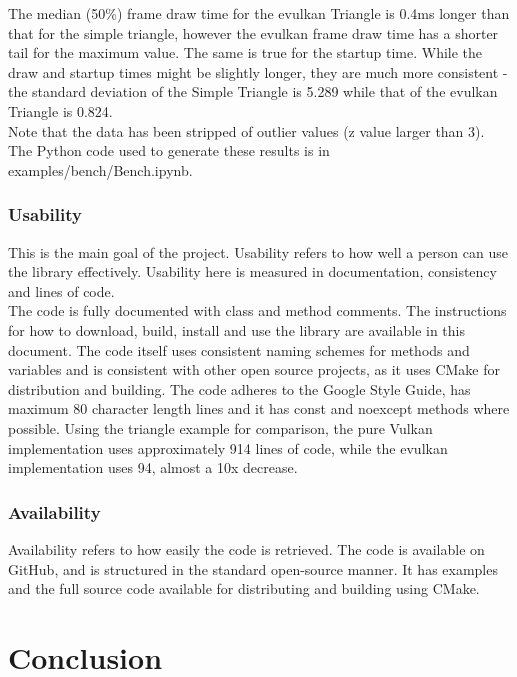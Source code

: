 \documentclass[12pt]{report}
\theoremstyle{definition}
\begin{document}
        The median (50\%) frame draw time for the evulkan Triangle is 0.4ms
        longer than that for the simple triangle, however the evulkan frame
        draw time has a shorter tail for the maximum value.  The same is true
        for the startup time. While the draw and startup times might be
        slightly longer, they are much more consistent - the standard
        deviation of the Simple Triangle is 5.289 while that of the evulkan
        Triangle is 0.824. \\

        Note that the data has been stripped of outlier values (z value larger than 3).
        The Python code used to generate these results is in examples/bench/Bench.ipynb.

    \subsection{Usability}

      This is the main goal of the project. Usability refers to how well a person
      can use the library effectively. Usability here is measured in
      documentation, consistency and lines of code. \\

      The code is fully documented with class and method comments. The
      instructions for how to download, build, install and use the library
      are available in this document. The code itself uses consistent naming
      schemes for methods and variables and is consistent with other open source
      projects, as it uses CMake for distribution and building. The code
      adheres to the Google Style Guide, has maximum 80 character length
      lines and it has const and noexcept methods where possible. Using
      the triangle example for comparison, the pure Vulkan implementation
      uses approximately 914 lines of code, while the evulkan implementation
      uses 94, almost a 10x decrease. 

    \subsection{Availability}

      Availability refers to how easily the code is retrieved. The code is
      available on GitHub, and is structured in the standard open-source
      manner. It has examples and the full source code available for
      distributing and building using CMake.

  \chapter{Conclusion}
\end{document}
